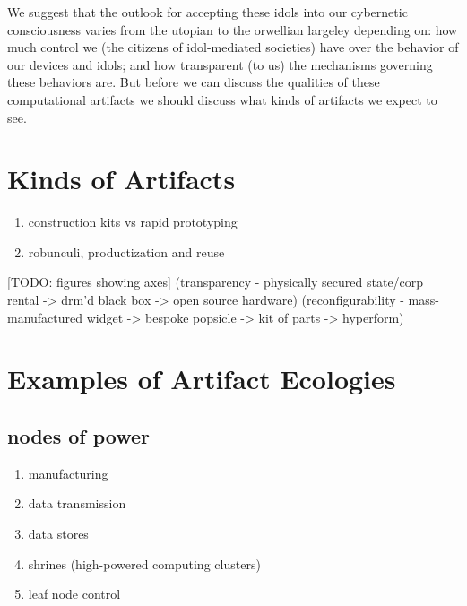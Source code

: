 We suggest that the outlook for accepting these idols into our cybernetic consciousness varies from the utopian to the orwellian largeley depending on: how much control we (the citizens of idol-mediated societies) have over the behavior of our devices and idols; and how transparent (to us) the mechanisms governing these behaviors are. But before we can discuss the qualities of these computational artifacts we should discuss what kinds of artifacts we expect to see.

\section{Kinds of Artifacts}
\label{sec:kinds_of_artifacts}
%
    \begin{enumerate}
        \item construction kits vs rapid prototyping
        \item robunculi, productization and reuse
    \end{enumerate}


[TODO: figures showing axes] (transparency - physically secured state/corp rental -> drm'd black box -> open source hardware) (reconfigurability - mass-manufactured widget -> bespoke popsicle -> kit of parts -> hyperform)


\section{Examples of Artifact Ecologies}
\label{sec:artifact_ecologies}
%
\subsection{nodes of power}
        \begin{enumerate}
            \item manufacturing
            \item data transmission
            \item data stores
            \item shrines (high-powered computing clusters)
            \item leaf node control
        \end{enumerate}        


